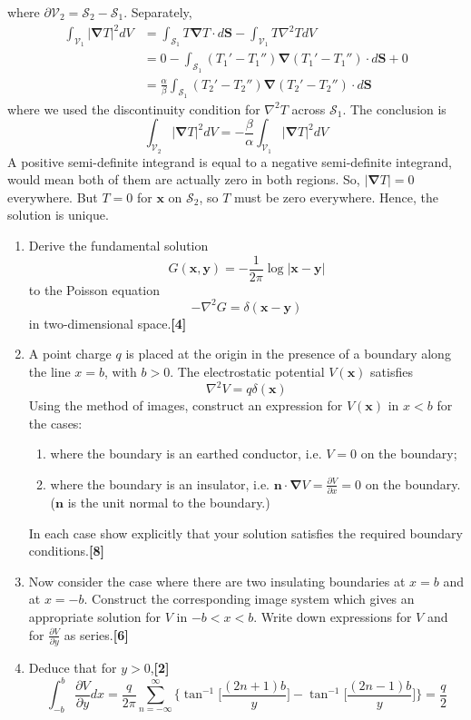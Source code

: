 \documentclass[a4paper]{article}
\begin{document}
\begin{ans}
\begin{enumerate}[label=(\roman*)]
where $\partial\mathcal{V}_2=\mathcal{S}_2-\mathcal{S}_1$. Separately, 
\begin{align}
\int_{\mathcal{V}_1}|\boldsymbol{\nabla}T|^2dV&=\int_{\mathcal{S}_1}T\boldsymbol{\nabla}T\cdot d\mathbf{S}-\int_{\mathcal{V}_1}T\nabla^2TdV\nonumber\\&=0-\int_{\mathcal{S}_1}(T_1'-T_1'')\boldsymbol{\nabla}(T_1'-T_1'')\cdot d\mathbf{S}+0\nonumber\\&=\frac{\alpha}{\beta}\int_{\mathcal{S}_1}(T_2'-T_2'')\boldsymbol{\nabla}(T_2'-T_2'')\cdot d\mathbf{S}\nonumber
\end{align}
where we used the discontinuity condition for $\nabla^2T$ across $\mathcal{S}_1$. The conclusion is 
$$\int_{\mathcal{V}_2}|\boldsymbol{\nabla}T|^2dV=-\frac{\beta}{\alpha}\int_{\mathcal{V}_1}|\boldsymbol{\nabla}T|^2dV$$
A positive semi-definite integrand is equal to a negative semi-definite integrand, would mean both of them are actually zero in both regions. So, $|\boldsymbol{\nabla}T|=0$ everywhere. But $T=0$ for $\mathbf{x}$ on $\mathcal{S}_2$, so $T$ must be zero everywhere. Hence, the solution is unique.
\end{enumerate}
\end{ans}
\begin{qns}\leavevmode
\begin{enumerate}[label=(\alph*)]
\item Derive the fundamental solution
$$G(\mathbf{x},\mathbf{y})=-\frac{1}{2\pi}\log|\mathbf{x}-\mathbf{y}|$$
to the Poisson equation
$$-\nabla^2G=\delta(\mathbf{x}-\mathbf{y})$$
in two-dimensional space.\hfill\textbf{[4]}
\item 
A point charge $q$ is placed at the origin in the presence of a boundary along the line $x = b$, with $b > 0$. The electrostatic potential $V(\mathbf{x})$ satisfies
$$\nabla^2V=q\delta(\mathbf{x})$$
Using the method of images, construct an expression for $V(\mathbf{x})$ in $x < b$ for the cases:
\begin{enumerate}[label=(\roman*)]
    \item where the boundary is an earthed conductor, i.e. $V = 0$ on the boundary;
    \item where the boundary is an insulator, i.e. $\mathbf{n}\cdot\boldsymbol{\nabla}V=\frac{\partial V}{\partial x}=0$ on the boundary. ($\mathbf{n}$ is the unit normal to the boundary.)
\end{enumerate}
In each case show explicitly that your solution satisfies the required boundary conditions.\hfill\textbf{[8]}
\item Now consider the case where there are two insulating boundaries at $x = b$  and at $x = −b$. Construct the corresponding image system which gives an appropriate solution for $V$ in $−b < x < b$. Write down expressions for $V$ and for $\frac{\partial V}{\partial y}$ as series.\hfill\textbf{[6]}
\item Deduce that for $y > 0$,\hfill\textbf{[2]}
$$\int_{-b}^b\frac{\partial V}{\partial y}dx=\frac{q}{2\pi}\sum_{n=-\infty}^{\infty}\bigg\{\tan^{-1}\bigg[\frac{(2n+1)b}{y}\bigg]-\tan^{-1}\bigg[\frac{(2n-1)b}{y}\bigg]\bigg\}=\frac{q}{2}$$
\end{enumerate}
\end{qns}
\end{document}
